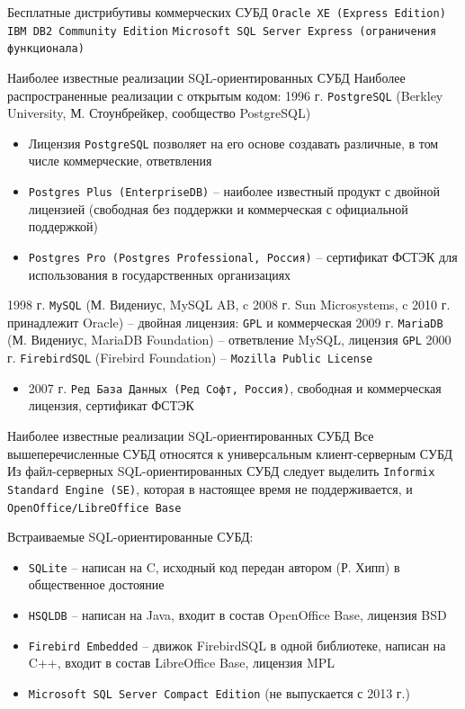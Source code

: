 \documentclass[a4paper,12pt]{article}
\begin{document}
Бесплатные дистрибутивы коммерческих СУБД  
\texttt{Oracle XE (Express Edition)}  
\texttt{IBM DB2 Community Edition}  
\texttt{Microsoft SQL Server Express (ограничения функционала)}

Наиболее известные реализации SQL-ориентированных СУБД  
Наиболее распространенные реализации с открытым кодом:  
1996 г. \texttt{PostgreSQL} (Berkley University, М. Стоунбрейкер, сообщество PostgreSQL)  
\begin{itemize}
\item Лицензия \texttt{PostgreSQL} позволяет на его основе создавать различные, в том числе коммерческие, ответвления
\item \texttt{Postgres Plus (EnterpriseDB)} – наиболее известный продукт с двойной лицензией (свободная без поддержки и коммерческая с официальной поддержкой)
\item \texttt{Postgres Pro (Postgres Professional, Россия)} – сертификат ФСТЭК для использования в государственных организациях
\end{itemize}

1998 г. \texttt{MySQL} (М. Видениус, MySQL AB, c 2008 г. Sun Microsystems, c 2010 г. принадлежит Oracle) – двойная лицензия: \texttt{GPL} и коммерческая  
2009 г. \texttt{MariaDB} (М. Видениус, MariaDB Foundation) – ответвление MySQL, лицензия \texttt{GPL}  
2000 г. \texttt{FirebirdSQL} (Firebird Foundation) – \texttt{Mozilla Public License}  
\begin{itemize}
\item 2007 г. \texttt{Ред База Данных (Ред Софт, Россия)}, свободная и коммерческая лицензия, сертификат ФСТЭК
\end{itemize}

Наиболее известные реализации SQL-ориентированных СУБД  
Все вышеперечисленные СУБД относятся к универсальным клиент-серверным СУБД  
Из файл-серверных SQL-ориентированных СУБД следует выделить \texttt{Informix Standard Engine (SE)}, которая в настоящее время не поддерживается, и \texttt{OpenOffice/LibreOffice Base}

Встраиваемые SQL-ориентированные СУБД:  
\begin{itemize}
\item \texttt{SQLite} – написан на C, исходный код передан автором (Р. Хипп) в общественное достояние
\item \texttt{HSQLDB} – написан на Java, входит в состав OpenOffice Base, лицензия BSD
\item \texttt{Firebird Embedded} – движок FirebirdSQL в одной библиотеке, написан на C++, входит в состав LibreOffice Base, лицензия MPL
\item \texttt{Microsoft SQL Server Compact Edition} (не выпускается с 2013 г.)
\end{itemize}
\end{document}
